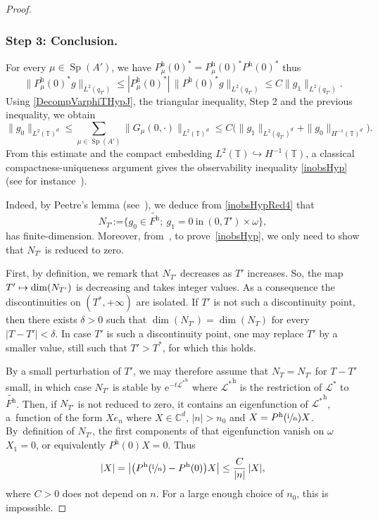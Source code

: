 \documentclass[JEP,XML,SOM,Unicode,NoEqCountersInSection]{cedram}
\let\mathcal\mathscr
\def\mto{\mathchoice{\longmapsto}{\mapsto}{\mapsto}{\mapsto}}
\theoremstyle{plain}
\theoremstyle{definition}
\theoremstyle{remark}
\DeclareMathOperator{\Sp}{Sp}
\newcommand{\set}{\mathbb}
\renewcommand{\C}{\set{C}}
\newcommand{\T}{\set{T}}
\newcommand{\coloneqq}{\mathrel{\mathord{:}\mathord=}}
\newcommand{\h}{{\mathrm h}}
\newcommand{\eu}{\mathrm e}
\newcommand{\iu}{\mathrm i}
\let\originalleft\left
\let\originalright\right
\renewcommand{\left}{\mathopen{}\mathclose\bgroup\originalleft}
\renewcommand{\right}{\aftergroup\egroup\originalright}
\begin{document}
\begin{proof}
\subsubsection*{Step 3: Conclusion.}
For every $\mu \in \Sp(A')$, we have
$P^\h_\mu(0)^*=P^\h_\mu(0)^* P^\h(0)^*$ thus
\[
\|P^\h_\mu(0)^* g\|_{L^2(q_{T'})} \leq |P^\h_\mu(0)^*|\, \| P^\h(0)^* g\|_{L^2(q_{T'})} \leq C \|g_1\|_{L^2(q_{T'})}.
\]
Using \eqref{DecompVarphiTHypJ}, the triangular inequality, Step 2 and the previous inequality, we obtain
\begin{equation} \label{inobsHypRed4}
\|g_0\|_{L^2(\T)^d} \leq \sum_{\mu \in \Sp(A')} \|G_\mu(0,\cdot)\|_{L^2(\T)^d}
\leq C \bigl(\|g_1\|_{L^2(q_{T'})^d}+ \| g_0\|_{H^{-1}(\T)^d} \bigr).
\end{equation}
From this estimate and the compact embedding $L^2(\T) \hookrightarrow H^{-1}(\T)$, a classical com\-pact\-ness-uniqueness argument gives the observability inequality \eqref{inobsHyp} (see for instance~\cite[Lem.\,2.1 and Rem.\,2.2]{duprez_2018b}).

Indeed, by Peetre's lemma (see~\cite[Lem.\,3]{peetre_1961}), we deduce from \eqref{inobsHypRed4} that\vspace*{-3pt}
\[
N_{T'} \coloneqq \{g_{0} \in \widetilde{F^{\h}};\ g_{1} = 0\ \text{in}\ (0,T')\times\omega\},
\]
has finite-dimension. Moreover, from~\cite[Lem.\,4]{peetre_1961}, to prove~\eqref{inobsHyp}, we only need to show that $N_{T'}$ is reduced to zero.

First, by definition, we remark that $N_{T'}$ decreases as $T'$ increases. So, the map $T' \mto \dim(N_{T'})$ is decreasing and takes integer values. As a consequence the discontinuities on $(T^\ast,+\infty)$ are isolated. If $T'$ is not such a discontinuity point, then there exists $\delta>0$ such that $\dim(N_{T'})=\dim(N_{T})$ for every $|T-T'|<\delta$. In case $T'$ is such a discontinuity point, one may replace $T'$ by a smaller value, still such that $T'>T^\ast$, for which this holds.

By a small perturbation of $T'$, we may therefore assume that $N_T = N_{T'}$ for $T-T'$ small, in which case $N_{T'}$ is stable by $\eu^{-t {\mathcal{L}^*}^\h}$ where ${\mathcal{L}^*}^\h$ is the restriction of ${\mathcal{L}^*}$ to~$\widetilde{F^\h}$. Then, if $N_{T'}$ is not reduced to zero, it contains an eigenfunction of ${\mathcal{L}^*}^\h$, \ie a~function of the form $X e_n$ where $X \in \C^d$, $|n|>n_0$ and $X =P^\h\left(\sfrac{\iu}{n}\right) X$. By~definition of $N_{T'}$, the first components of that eigenfunction vanish on $\omega$ \ie $X_1=0$, or equivalently $P^\h(0)X=0$. Thus\vspace*{-3pt}
\[
|X| = \left| \left(P^\h\left(\sfrac{\iu}{n}\right) - P^\h (0) \right) X \right| \leq \frac{C}{|n|}\, |X|,
\]
where $C>0$ does not depend on $n$. For a large enough choice of $n_0$, this is impossible.
\end{proof}
\end{document}
